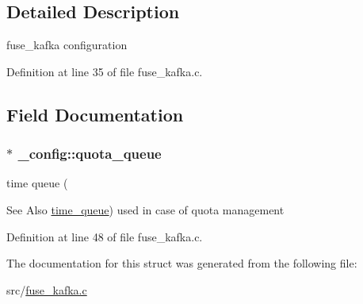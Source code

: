 \subsection{Detailed Description}
fuse\-\_\-kafka configuration 

Definition at line 35 of file fuse\-\_\-kafka.\-c.



\subsection{Field Documentation}
\hypertarget{struct__config_a145aaea5a1685bb59a5187bb4f2c5829}{
\subsubsection[{quota\-\_\-queue}]{$\ast$ \-\_\-config\-::quota\-\_\-queue}}\label{struct__config_a145aaea5a1685bb59a5187bb4f2c5829}


time queue ( 

\begin{DoxySeeAlso}{See Also}
\hyperlink{structtime__queue}{time\-\_\-queue}) used in case of quota management 
\end{DoxySeeAlso}


Definition at line 48 of file fuse\-\_\-kafka.\-c.



The documentation for this struct was generated from the following file\-:\begin{DoxyCompactItemize}
\item 
src/\hyperlink{fuse__kafka_8c}{fuse\-\_\-kafka.\-c}\end{DoxyCompactItemize}

